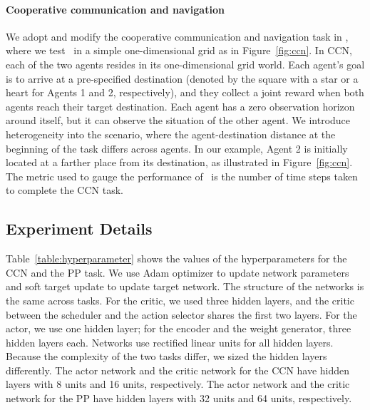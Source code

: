 \paragraph{Cooperative communication and navigation}
We adopt and modify the cooperative communication and navigation task
in \cite{lowe2017multi}, where we test \sched~in a simple
one-dimensional grid as in Figure~\ref{fig:ccn}. In CCN, each of the two
agents resides in its one-dimensional grid world. Each agent's goal is
to arrive at a pre-specified destination (denoted by the square with a
star or a heart for Agents 1 and 2, respectively), and they collect a
joint reward when both agents reach their target destination. Each
agent has a zero observation horizon around itself, but it can observe
the situation of the other agent. We introduce heterogeneity into the
scenario, where the agent-destination distance at the beginning of the
task differs across agents.
In our example, Agent 2 is initially located at a farther place from
its destination, as illustrated in Figure~\ref{fig:ccn}. The metric
used to gauge the performance of \sched~is the number of time steps
taken to complete the CCN task.


\subsection{Experiment Details}
Table~\ref{table:hyperparameter} shows the values of the hyperparameters for the CCN and the PP task. 
We use Adam optimizer to update network parameters and soft target update to update target network. The structure of the networks is the same across tasks.
For the critic, we used three hidden layers, and the critic between the scheduler and the action selector shares the first two layers. For the actor, we use one hidden layer; for the encoder and the weight generator, three hidden layers each. Networks use rectified linear units for all hidden layers.
Because the complexity of the two tasks differ, we sized the hidden layers differently. The actor network and the critic network for the CCN have hidden layers
with 8 units and 16 units, respectively. The actor network and the critic network for the PP have hidden layers with 32 units and 64 units, respectively.


